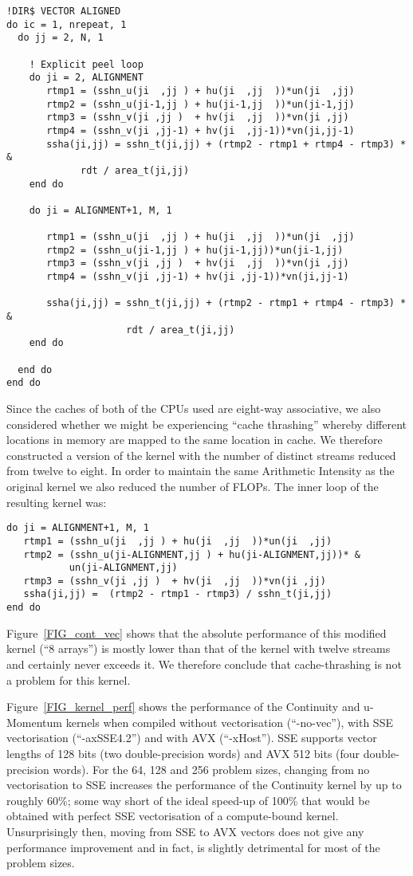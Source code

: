 \documentclass[12pt]{article}
\begin{document}
\begin{verbatim}
!DIR$ VECTOR ALIGNED
do ic = 1, nrepeat, 1
  do jj = 2, N, 1

    ! Explicit peel loop
    do ji = 2, ALIGNMENT
       rtmp1 = (sshn_u(ji  ,jj ) + hu(ji  ,jj  ))*un(ji  ,jj)
       rtmp2 = (sshn_u(ji-1,jj ) + hu(ji-1,jj  ))*un(ji-1,jj)
       rtmp3 = (sshn_v(ji ,jj )  + hv(ji  ,jj  ))*vn(ji ,jj)
       rtmp4 = (sshn_v(ji ,jj-1) + hv(ji  ,jj-1))*vn(ji,jj-1)
       ssha(ji,jj) = sshn_t(ji,jj) + (rtmp2 - rtmp1 + rtmp4 - rtmp3) * &
             rdt / area_t(ji,jj)
    end do
    
    do ji = ALIGNMENT+1, M, 1

       rtmp1 = (sshn_u(ji  ,jj ) + hu(ji  ,jj  ))*un(ji  ,jj)
       rtmp2 = (sshn_u(ji-1,jj ) + hu(ji-1,jj))*un(ji-1,jj)
       rtmp3 = (sshn_v(ji ,jj )  + hv(ji  ,jj  ))*vn(ji ,jj)
       rtmp4 = (sshn_v(ji ,jj-1) + hv(ji ,jj-1))*vn(ji,jj-1)

       ssha(ji,jj) = sshn_t(ji,jj) + (rtmp2 - rtmp1 + rtmp4 - rtmp3) * &
                     rdt / area_t(ji,jj)
    end do
    
  end do
end do
\end{verbatim}

Since the caches of both of the CPUs used are eight-way associative,
we also considered whether we might be experiencing ``cache
thrashing'' whereby different locations in memory are mapped to the
same location in cache. We therefore constructed a version of the
kernel with the number of distinct streams reduced from twelve to
eight. In order to maintain the same Arithmetic Intensity as the
original kernel we also reduced the number of FLOPs. The inner loop of
the resulting kernel was:
\begin{verbatim}
do ji = ALIGNMENT+1, M, 1
   rtmp1 = (sshn_u(ji  ,jj ) + hu(ji  ,jj  ))*un(ji  ,jj)
   rtmp2 = (sshn_u(ji-ALIGNMENT,jj ) + hu(ji-ALIGNMENT,jj))* &
           un(ji-ALIGNMENT,jj)
   rtmp3 = (sshn_v(ji ,jj )  + hv(ji  ,jj  ))*vn(ji ,jj)
   ssha(ji,jj) =  (rtmp2 - rtmp1 - rtmp3) / sshn_t(ji,jj)
end do
\end{verbatim}

Figure~\ref{FIG_cont_vec} shows that the absolute performance of this
modified kernel (``8 arrays'') is mostly lower than that of the kernel
with twelve streams and certainly never exceeds it. We therefore
conclude that cache-thrashing is not a problem for this kernel.

Figure~\ref{FIG_kernel_perf} shows the performance of the Continuity
and u-Momentum kernels when compiled without vectorisation
(``-no-vec''), with SSE vectorisation (``-axSSE4.2'') and with AVX
(``-xHost''). SSE supports vector lengths of 128 bits (two
double-precision words) and AVX 512 bits (four double-precision
words). For the 64, 128 and 256 problem sizes, changing from no
vectorisation to SSE increases the performance of the Continuity
kernel by up to roughly 60\%; some way short of the ideal speed-up of
100\% that would be obtained with perfect SSE vectorisation of a
compute-bound kernel. Unsurprisingly then, moving from SSE to AVX
vectors does not give any performance improvement and in fact, is
slightly detrimental for most of the problem sizes.
\end{document}
